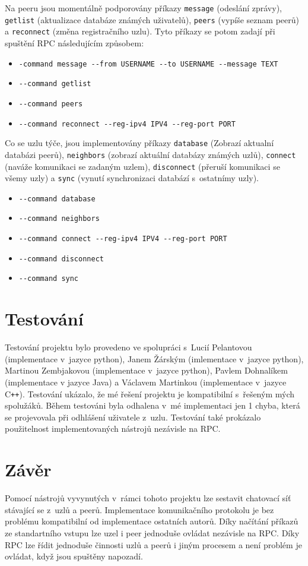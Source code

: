 \documentclass[11pt,a4paper,titlepage]{article}
\begin{document}
            Na peeru jsou momentálně podporovány
            příkazy \texttt{message} (odeslání zprávy), \texttt{getlist} (aktualizace databáze známých uživatelů),
            \texttt{peers} (vypíše seznam peerů) a \texttt{reconnect} (změna registračního uzlu).
            Tyto příkazy se potom zadají při spuštění RPC následujícím způsobem:
            \begin{itemize}
                \item \verb+-command message --from USERNAME --to USERNAME --message TEXT+
                \item \verb+--command getlist+
                \item \verb+--command peers+
                \item \verb+--command reconnect --reg-ipv4 IPV4 --reg-port PORT+
            \end{itemize}

            Co se uzlu týče, jsou implementovány příkazy \texttt{database} (Zobrazí aktualní databázi peerů),
            \texttt{neighbors} (zobrazí aktuální databázy známých uzlů), \texttt{connect} (naváže komunikaci se zadaným uzlem),
            \texttt{disconnect} (přeruší komunikaci se všemy uzly) a \texttt{sync} (vynutí synchronizaci databází s~ostatnímy uzly).
            \begin{itemize}
                \item \verb+--command database+
                \item \verb+--command neighbors+
                \item \verb+--command connect --reg-ipv4 IPV4 --reg-port PORT+
                \item \verb+--command disconnect+
                \item \verb+--command sync+
            \end{itemize}

    \section{Testování}
        Testování projektu bylo provedeno ve spolupráci s~Lucií Pelantovou (implementace v~jazyce python), Janem Žárským (imlementace v~jazyce python),
        Martinou Zembjakovou (implementace v~jazyce python), Pavlem Dohnalíkem (implementace v jazyce Java) a Václavem Martinkou (implementace v~jazyce C\texttt{++}).
        Testování ukázalo, že mé řešení projektu je kompatibilní s~řešeným mých spolužáků. Během testováni byla odhalena v~mé implementaci jen 1 chyba,
        která se projevovala při odhlášení uživatele z~uzlu. Testování také prokázalo použitelnost implementovaných nástrojů nezávisle na RPC.
    \section{Závěr}
        Pomocí nástrojů vyvynutých v~rámci tohoto projektu lze sestavit chatovací síť stávající se z~uzlů a peerů. Implementace komunikačního
        protokolu je bez problému kompatibilní od implementace ostatních autorů. Díky načítání příkazů ze standartního vstupu lze uzel i peer
        jednoduše ovládat nezávisle na RPC. Díky RPC lze řídit jednoduše činnosti uzlů a peerů i jiným procesem a není problém je ovládat,
        když jsou spuštěny napozadí.
\end{document}
